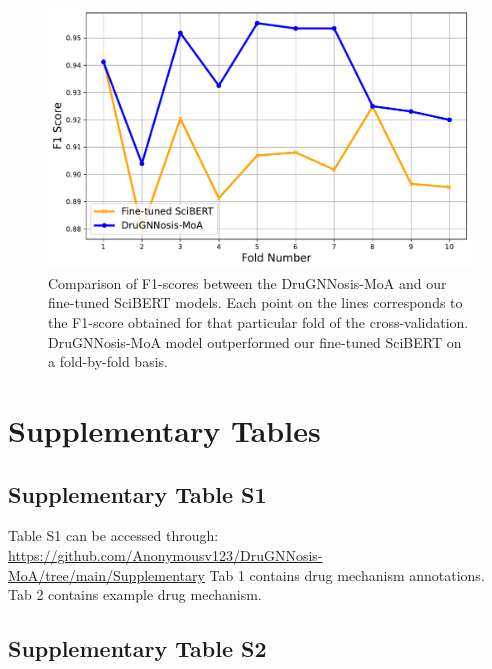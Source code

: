 \documentclass[journal,twoside,web]{ieeecolor}
\begin{document}
\begin{figure}[h!]
\centering
   \includegraphics[width=\linewidth]{Figures/Comparison_F1_Scores_2_models.pdf}
   \caption{
    Comparison of F1-scores between the DruGNNosis-MoA and our fine-tuned SciBERT models.
   Each point on the lines corresponds to the F1-score obtained for that particular fold of the cross-validation.
   DruGNNosis-MoA model outperformed our fine-tuned SciBERT on a fold-by-fold basis.}
\label{fig:fscore1}
\end{figure}



\newpage
\section{Supplementary Tables}
\label{sec11}

\subsection{Supplementary Table S1} 
Table S1 can be accessed through: 
\url{https://github.com/Anonymousv123/DruGNNosis-MoA/tree/main/Supplementary}
Tab 1 contains drug mechanism annotations.
Tab 2 contains example drug mechanism.


\subsection{Supplementary Table S2}
\end{document}
